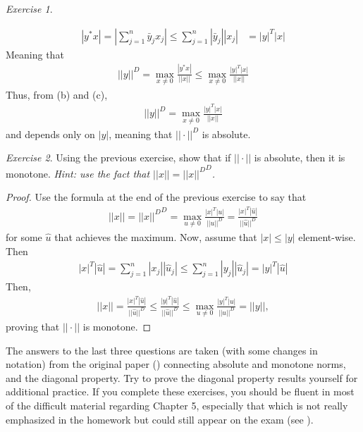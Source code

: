 \documentclass[11pt]{article}
\theoremstyle{plain}
\theoremstyle{definition}
\theoremstyle{remark}
\newtheorem{exc}{Exercise}[section]
\begin{document}
\begin{exc}
\begin{enumerate}
        \begin{align*}
            |y^* x| = \left|\sum_{j=1}^n \bar{y}_j x_j \right| \leq \sum_{j=1}^n |\bar{y}_j| |x_j| &= |y|^T |x|
        \end{align*}
        Meaning that
        \begin{align*}
            ||y||^D = \max_{x \neq 0} \frac{|y^* x|}{||x||} \leq \max_{x \neq 0} \frac{ |y|^T |x|}{||x||}
        \end{align*}
        Thus, from (b) and (c), 
        \begin{align*}
            ||y||^D = \max_{x \neq 0} \frac{ |y|^T |x|}{||x||}
        \end{align*}
        and depends only on $|y|$, meaning that $||\cdot||^D$ is absolute.
    \end{enumerate}
\end{exc}

\begin{exc}
    Using the previous exercise, show that if $||\cdot||$ is absolute, then it is monotone. {\it Hint: use the fact that $||x|| = {||x||^D}^D$.}
    \begin{proof}
        Use the formula at the end of the previous exercise to say that
        \begin{align*}
            ||x|| = {||x||^D}^D = \max_{u \neq 0} \frac{ |x|^T |u|}{||u||^D} = \frac{ |x|^T |\hat{u}|}{||\hat{u}||^D}
        \end{align*}
        for some $\hat{u}$ that achieves the maximum. Now, assume that $|x| \leq |y|$ element-wise. Then
        \begin{align*}
            |x|^T |\hat{u}| = \sum_{j=1}^n |x_j| |\hat{u}_j| \leq \sum_{j=1}^n |y_j| |\hat{u}_j| = |y|^T |\hat{u}|
        \end{align*}
        Then,
        \begin{align*}
            ||x|| = \frac{ |x|^T |\hat{u}|}{||\hat{u}||^D} \leq \frac{ |y|^T |\hat{u}|}{||\hat{u}||^D} \leq \max_{u \neq 0} \frac{ |y|^T |u|}{||u||^D} = ||y||,
        \end{align*}
        proving that $||\cdot||$ is monotone.
    \end{proof}
\end{exc}

The answers to the last three questions are taken (with some changes in notation) from the original paper (\citet{monotone}) connecting absolute and monotone norms, and the diagonal property. Try to prove the diagonal property results yourself for additional practice. If you complete these exercises, you should be fluent in most of the difficult material regarding Chapter 5, especially that which is not really emphasized in the homework but could still appear on the exam (see ).
\end{document}
